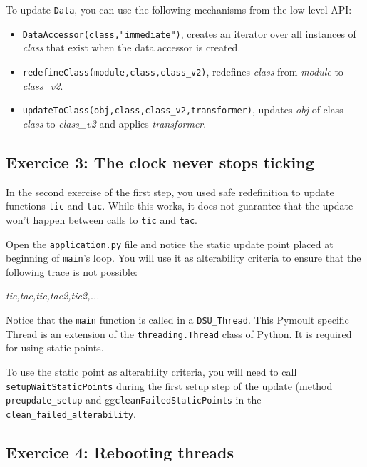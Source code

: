 \documentclass{article}
\begin{document}
To update \texttt{Data}, you can use the following mechanisms from the
low-level API:

\begin{itemize}
\item \texttt{DataAccessor(class,"immediate")}, creates an iterator
  over all instances of \textit{class} that exist when the data
  accessor is created.

\item \texttt{redefineClass(module,class,class_v2)}, redefines
  \textit{class} from \textit{module} to \textit{class\_v2}.

\item \texttt{updateToClass(obj,class,class\_v2,transformer)}, updates
  \textit{obj} of class \textit{class} to \textit{class\_v2} and
  applies \textit{transformer}.

\end{itemize}

\subsection{Exercice 3: The clock never stops ticking}

In the second exercise of the first step, you used safe redefinition
to update functions \texttt{tic} and \texttt{tac}. While this works,
it does not guarantee that the update won't happen between calls to
\texttt{tic} and \texttt{tac}.

Open the \texttt{application.py} file and notice the static update
point placed at beginning of \texttt{main}'s loop. You will use it as
alterability criteria to ensure that the following trace is not possible:

\textit{tic,tac,tic,tac2,tic2,...}


Notice that the \texttt{main} function is called in a
\texttt{DSU\_Thread}. This Pymoult specific Thread is an extension of
the \texttt{threading.Thread} class of Python. It is required for
using static points.


To use the static point as alterability criteria, you will need to
call \texttt{setupWaitStaticPoints} during the first setup step of the
update (method \texttt{preupdate\_setup} and
gg\texttt{cleanFailedStaticPoints} in the
\texttt{clean\_failed\_alterability}.

\subsection{Exercice 4: Rebooting threads}
\end{document}
